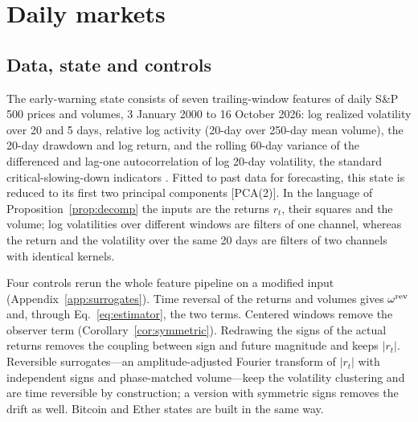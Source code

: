 \section{Daily markets}\label{sec:market}

\subsection{Data, state and controls}\label{sec:data}

The early-warning state consists of seven trailing-window features of daily S\&P 500 prices and volumes, 3 January 2000 to 16 October 2026: log realized volatility over 20 and 5 days, relative log activity (20-day over 250-day mean volume), the 20-day drawdown and log return, and the rolling 60-day variance of the differenced and lag-one autocorrelation of log 20-day volatility, the standard critical-slowing-down indicators \cite{dakos2012}. Fitted to past data for forecasting, this state is reduced to its first two principal components [PCA(2)]. In the language of Proposition~\ref{prop:decomp} the inputs are the returns $r_t$, their squares and the volume; log volatilities over different windows are filters of one channel, whereas the return and the volatility over the same 20 days are filters of two channels with identical kernels.

Four controls rerun the whole feature pipeline on a modified input (Appendix~\ref{app:surrogates}). Time reversal of the returns and volumes gives $\omega^{\rm rev}$ and, through Eq.~\eqref{eq:estimator}, the two terms. Centered windows remove the observer term (Corollary~\ref{cor:symmetric}). Redrawing the signs of the actual returns removes the coupling between sign and future magnitude and keeps $|r_t|$. Reversible surrogates---an amplitude-adjusted Fourier transform \cite{schreiber1996} of $|r_t|$ with independent signs and phase-matched volume---keep the volatility clustering and are time reversible by construction; a version with symmetric signs removes the drift as well. Bitcoin and Ether states are built in the same way.

\begin{table}[t]
\squeezetable
\caption{Lag-one antisymmetry of the market states and its decomposition, Eq.~\eqref{eq:estimator}. $\omega$, $\omega^{\rm rev}$ and $\omega^{\rm cen}$ are computed on features from the data, from the time-reversed input and with centered windows; $O=\tfrac12(\omega+\omega^{\rm rev})$, $P=\tfrac12(\omega-\omega^{\rm rev})$. In parentheses, moving-block-bootstrap standard errors in units of the last digit (20-day blocks, 1000 replicates, the three series resampled jointly; 60-day blocks in Table~). Surrogates: median [5\%, 95\%] of 200 (S\&P 500) or 100 (Bitcoin, Ether) reversible surrogates. The PCA(2) state is evaluated in the basis of the observed loadings. The centered drawdown is not a symmetric-kernel version of the trailing one (Sec.~\ref{sec:leverage}), so $\omega^{\rm cen}$ does not estimate $P$ in that row.}
\label{tab:markets}

\end{table}

